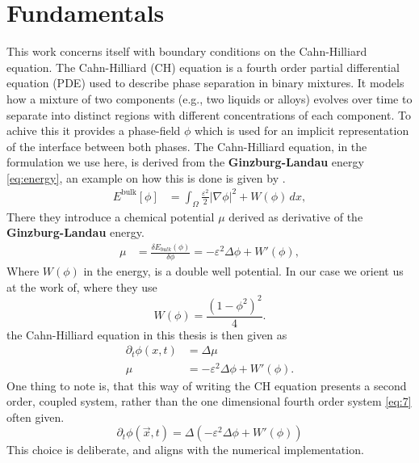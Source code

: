 \documentclass{mimosis}
\begin{document}
\chapter{Fundamentals}
\label{sec:org5b96c8b}
This work concerns itself with boundary conditions on the Cahn-Hilliard equation. The Cahn-Hilliard (CH) equation is a fourth order partial differential equation (PDE) used to describe phase separation in binary mixtures. It models how a mixture of two components (e.g., two liquids or alloys) evolves over time to separate into distinct regions with different concentrations of each component. To achive this it provides a phase-field \(\phi\) which is used for an implicit representation of the interface between both phases. The Cahn-Hilliard equation, in the formulation we use here, is derived from the \textbf{Ginzburg-Landau} energy \eqref{eq:energy}, an example on how this is done is given by \autocite{Wu_2022}.
\begin{align}
\label{eq:energy}
E^{\text{bulk}}[\phi] &= \int_{\Omega} \frac{\varepsilon^2}{2} |\nabla \phi |^2 + W(\phi) \, dx ,
\end{align}
There they introduce a chemical potential \(\mu\) derived as derivative of the \textbf{Ginzburg-Landau} energy.
\begin{align}
\label{eq:chemical-potential}
 \mu &= \frac{\delta E_{bulk}(\phi)}{\delta \phi} = -\varepsilon^2 \Delta \phi + W'(\phi),
\end{align}
Where \(W(\phi)\) in the energy, is a double well potential. In our case we orient us at the work of\autocite{SHIN20117441}, where they use
\begin{equation}
\label{eq:6}
W(\phi) = \frac{(1-\phi^2)^2}{4}.
\end{equation}
the Cahn-Hilliard equation in this thesis is then given as
\begin{equation}
\begin{aligned}
\partial_{t}\phi(x,t) &=  \Delta\mu \\
\mu &= - \varepsilon^2 \Delta\phi  + W'(\phi).
\end{aligned}
\end{equation}
One thing to note is, that this way of writing the CH equation presents a second order, coupled system, rather than the one dimensional fourth order system \eqref{eq:7} often given.
\begin{equation}
\label{eq:7}
\partial_t \phi(\vec{x} , t) = \Delta(-\varepsilon^2  \Delta \phi + W\prime(\phi))
\end{equation}
This choice is deliberate, and aligns with the numerical implementation.
\end{document}
